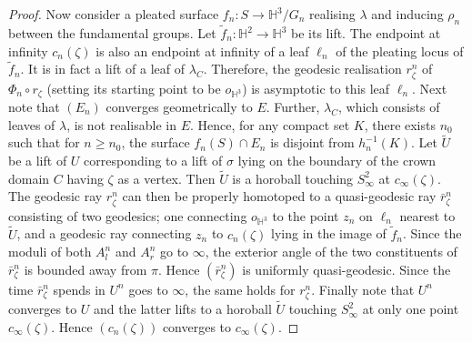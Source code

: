 \documentclass{amsart}
\theoremstyle{definition}
\newcommand\HHH{{\mathbb H}}
\newcommand\til{\widetilde}
\begin{document}
\begin{proof}
Now consider a pleated surface $f_n\colon S \to \HHH^3/G_n$  realising $\lambda$ and inducing $\rho_n$ between the fundamental groups. Let $\tilde f_n \colon \HHH^2 \to \HHH^3$ be its lift.
The endpoint at infinity $c_n(\zeta)$ is also an endpoint at infinity of a leaf $\ell_n$ of the pleating locus of $\tilde f_n$. It  is in fact a lift of a leaf of $\lambda_C$. Therefore, the geodesic realisation $r_\zeta^n$ of $\Phi_n \circ r_\zeta$ (setting its starting point to be $o_{\HHH^3}$) is asymptotic to this leaf $\ell_n$.
Next note that $(E_n)$ converges geometrically to $E$. Further, $\lambda_C$, which consists of leaves of $\lambda$, is not realisable in $E$.  Hence,
 for any compact set $K$, there exists $n_0$ such that for $n \geq n_0$, the surface $f_n(S) \cap E_n$ is disjoint from $h_n^{-1}(K)$.
Let $\widetilde U$ be a lift of $U$ corresponding to a lift of $\sigma$  lying on the boundary of the crown domain $C$ having $\zeta$ as a vertex.
Then $\widetilde U$ is a horoball touching $S^2_\infty$ at $c_\infty(\zeta)$.
The geodesic ray $r_\zeta^n$ can then be properly homotoped to a quasi-geodesic ray $\bar r_\zeta^n$ consisting of two geodesics; one connecting $o_{\HHH^3}$ to the point $z_n$ on $\ell_n$ nearest to $\widetilde U$, and a geodesic ray connecting $z_n$ to $c_n(\zeta)$ lying in the image of $\tilde f_n$.
Since the moduli of  both $A_l^n$ and $A_r^n$ go to $\infty$, the exterior angle of the two constituents of $\bar r_\zeta^n$ is bounded away from $\pi$. Hence $(\bar r_\zeta^n)$ is uniformly quasi-geodesic.
Since the time $\bar r_\zeta^n$ spends in $U^n$ goes to $\infty$, the same holds for $r_\zeta^n$.
Finally note that $U^n$ converges to $U$ and the latter lifts to a horoball $\widetilde U$ touching $S^2_\infty$ at only one point $c_\infty(\zeta)$. Hence $(c_n(\zeta))$ converges to $c_\infty(\zeta)$.
\end{proof}
\end{document}
